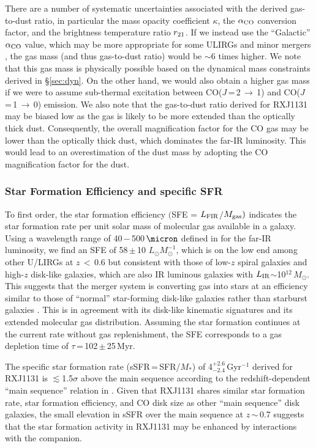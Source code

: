 \documentclass[]{emulateapj}
\newcommand{\Msun}{\mbox{$M_{\odot}$}\xspace}
\newcommand{\Lsun}{\mbox{$L_{\odot}$}\xspace}
\newcommand{\LIR}{\mbox{$L_{\rm IR}$}\xspace}
\newcommand{\LFIR}{\mbox{$L_{\rm FIR}$}\xspace}
\newcommand{\rarr}{$\rightarrow$}
\newcommand{\aco}{\mbox{CO($J$\,=\,1\,\rarr\,0)}\xspace}
\newcommand{\bco}{\mbox{CO($J$\,=\,2\,\rarr\,1)}\xspace}
\newcommand{\pmOne}{\mbox{$^{-1}$}\xspace}
\newcommand{\alphaco}{\mbox{$\alpha_{\rm CO}$}\xspace}
\newcommand{\petm}[2]{$^{+#1}_{-#2}$}
\newcommand{\eq}{\,=\,}
\newcommand{\ssim}{\,$\sim$\,}
\newcommand{\pmm}{\,$\pm$\,}
\newcommand{\eg}{{e.g.,~}}
\newcommand{\Sec}[1]{\S\ref{sec:#1}}
\newcommand{\SF}{star formation\xspace}
\newcommand{\fir}{far-IR\xspace}
\begin{document}
There are a number of systematic uncertainties associated with the derived gas-to-dust ratio, in particular
the mass opacity coefficient $\kappa$,
the \alphaco conversion factor, and the brightness temperature ratio $r_{\rm 21}$.
If we instead use the ``Galactic'' \alphaco value, which may be more appropriate for some ULIRGs \citep[\eg][]{Papadopoulos12a} and minor mergers \citep{Narayanan12a},
the gas mass (and thus gas-to-dust ratio) would be $\sim$6 times higher.
We note that this gas mass is physically possible based on the dynamical mass constraints derived in \Sec{dyn}.
On the other hand, we would also obtain a higher gas mass if
we were to assume sub-thermal excitation between \bco and \aco emission.
We also note that the gas-to-dust ratio derived for RXJ1131 may be biased low as the gas is likely to
be more extended than the optically thick dust. Consequently, the overall magnification factor
for the CO gas may be lower than the optically thick dust, which dominates the \fir luminosity.
This would lead to an overestimation of the dust mass
by adopting the CO magnification factor for the dust.

\subsubsection{Star Formation Efficiency and specific SFR}

To first order, the star formation efficiency
$($SFE = \LFIR$/$$M_{\rm gas})$ indicates the \SF rate per unit solar mass of molecular gas available in a galaxy.
Using a wavelength range of 40\,$-$\,500\,$\micron$ defined
in  for the far-IR luminosity,
we find an SFE of 58\pmm10 \Lsun $M_{\odot}^{-1}$,
which is on the low end among other U/LIRGs at $z$\,$<$\,0.6
\citep[;][]{Combes11a} but consistent with those of
low-$z$ spiral galaxies \citep[$z$\,$<$\,0.1;][]{SV05a} and high-$z$ disk-like
galaxies, which are also IR luminous galaxies with \LIR$\sim$10$^{12}$\,\Msun \citep{Daddi08a, Daddi10a}.
This suggests that the merger system is converting gas into stars at an efficiency
similar to those of ``normal'' star-forming
disk-like galaxies rather than starburst galaxies
\citep[][]{Tacconi08a, Riechers11a}.
This is in agreement with its disk-like kinematic signatures and its extended molecular gas distribution.
Assuming the \SF continues at the current rate without gas replenishment,
the SFE corresponds to a
gas depletion time of $\tau$\,=\,102\pmm25\,Myr.

The specific star formation rate (sSFR\eq SFR/$M_*$) of 4\petm{2.6}{2.4}\,Gyr\pmOne derived for RXJ1131
is $\lesssim$1.5$\sigma$ above the main sequence according to
the redshift-dependent ``main sequence'' relation in \citet[and references therein]{Tacconi13a}.
Given that RXJ1131 shares similar \SF rate, \SF efficiency, and CO disk size as other ``main sequence'' disk galaxies,
the small elevation in sSFR over the main sequence at $z$\ssim0.7 suggests
that the \SF activity in RXJ1131 may be enhanced by interactions with the companion.
\end{document}
